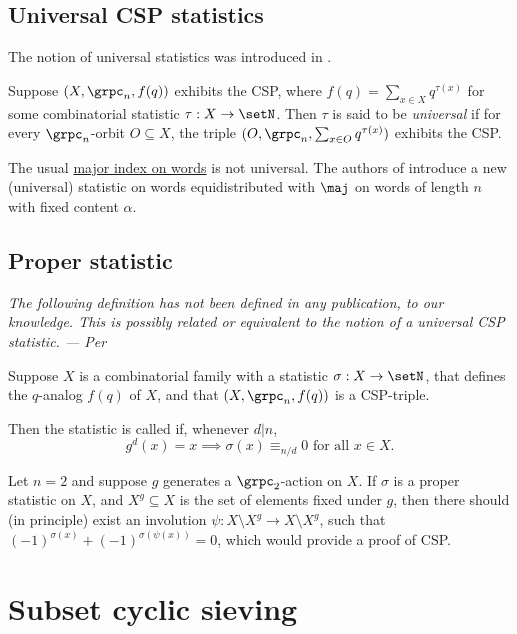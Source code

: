 \subsection[cspUniversal]{Universal CSP statistics}

The notion of universal statistics was introduced in \cite{AhlbachSwanson2018}.

Suppose $(X,\grpc_n,f(q))$ exhibits the CSP, where $f(q) = \sum_{x\in X} q^{\tau(x)}$
for some combinatorial statistic $\tau:X \to \setN$.
Then $\tau$ is said to be \emph{universal} if for every $\grpc_n$-orbit $O \subseteq X$,
the triple $(O,\grpc_n,\sum_{x\in O} q^{\tau(x)})$ exhibits the CSP.

The usual \hyperref[cspWords]{major index on words} is not universal.
The authors of \cite{AhlbachSwanson2018} introduce a new (universal) statistic on words
equidistributed with $\maj$ on words of length $n$ with fixed content $\alpha$.

\subsection[cspProper]{Proper statistic}

\emph{The following definition has not been defined in any publication, to our knowledge.
This is possibly related or equivalent to the notion of a universal CSP statistic.
 --- Per}

Suppose $X$ is a combinatorial family with a statistic $\sigma:X \to \setN$,
that defines the $q$-analog $f(q)$ of $X$, and that $(X, \grpc_n, f(q))$ is a CSP-triple.

Then the statistic is called  if, whenever $d|n$,
\[
 g^{d}(x) = x \implies   \sigma(x) \equiv_{n/d} 0   \text{ for all } x \in X.
\]

\begin{example}
Let $n=2$ and suppose $g$ generates a $\grpc_2$-action on $X$.
If $\sigma$ is a proper statistic on $X$, and $X^g \subseteq X$ is the set of
elements fixed under $g$, then there should (in principle)
exist an involution $\psi : X\setminus X^g \to X\setminus X^g$,
such that $(-1)^{\sigma(x)}+(-1)^{\sigma(\psi(x))} = 0$,
which would provide a proof of CSP.
\end{example}



\section[subsetCyclicSieving]{Subset cyclic sieving}

